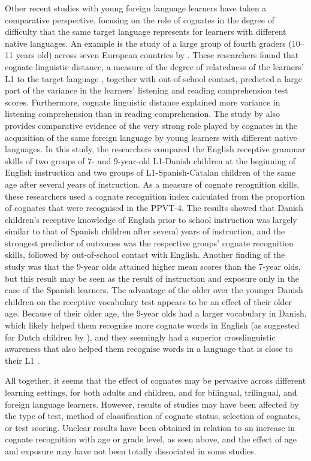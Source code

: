 \documentclass[output=paper,modfonts,nonflat,newtxmath]{langsci/langscibook}
\begin{document}
Other recent studies with young foreign language learners have taken a comparative perspective, focusing on the role of cognates in the degree of difficulty that the same target language represents for learners with different native languages. An example is the study of  a large group of fourth graders (10--11 years old) across seven European countries by \citet{LindgrenMuñoz2013}. These researchers found that cognate linguistic distance, a measure of the degree of relatedness of the learners’ L1 to the target language \citep{DyenEtAl1992}, together with out-of-school contact, predicted a large part of the variance in the learners’ listening and reading comprehension test scores. Furthermore, cognate linguistic distance explained more variance in listening comprehension than in reading comprehension. The study by \citet{MuñozEtAl2018} also provides comparative evidence of the very strong role played by cognates in the acquisition of the same foreign language by young learners with different native languages. In this study, the researchers compared the English receptive grammar skills of two groups of 7- and 9-year-old L1-Danish children at the beginning of English instruction and two groups of L1-Spanish-Catalan children of the same age after several years of instruction. As a measure of cognate recognition skills, these researchers used a cognate recognition index calculated from the proportion of cognates that were recognised in the PPVT-4. The results showed that Danish children’s receptive knowledge of English prior to school instruction was largely similar to that of Spanish children after several years of instruction, and the strongest predictor of outcomes was the respective groups’ cognate recognition skills, followed by out-of-school contact with English. Another finding of the study was that the 9-year olds attained higher mean scores than the 7-year olds, but this result may be seen as the result of instruction and exposure only in the case of the Spanish learners. The advantage of the older over the younger Danish children on the receptive vocabulary test appears to be an effect of their older age. Because of their older age, the 9-year olds had a larger vocabulary in Danish, which likely helped them recognise more cognate words in English (as suggested for Dutch children by \citealt{UnsworthEtAl2015}), and they seemingly had a superior crosslinguistic awareness that also helped them recognise words in a language that is close to their L1 \citep{Otwinowska2016}.

All together, it seems that the effect of cognates may be pervasive across different learning settings, for both adults and children, and for bilingual, trilingual, and foreign language learners. However, results of studies may have been affected by the type of test, method of classification of cognate status, selection of cognates, or test scoring. Unclear results have been obtained in relation to an increase in cognate recognition with age or grade level, as seen above, and the effect of age and exposure may have not been totally dissociated in some studies.
\end{document}
